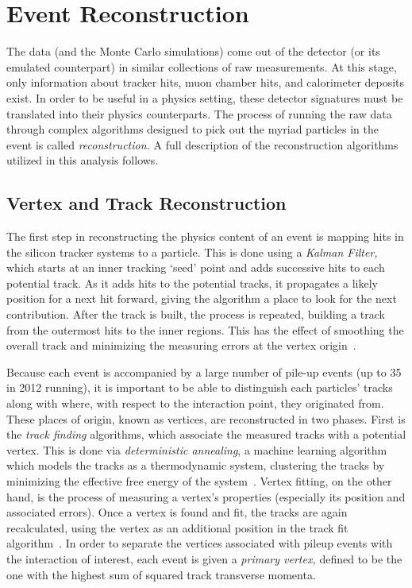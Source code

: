 \chapter{Event Reconstruction}
\label{chapter:eventReco}

The data (and the Monte Carlo simulations) come out of the detector (or its
emulated counterpart) in similar collections of raw measurements. At this stage,
only information about tracker hits, muon chamber hits, and calorimeter deposits
exist. In order to be useful in a physics setting, these detector signatures must be
translated into their physics counterparts. The process of running the raw data
through complex algorithms designed to pick out the myriad particles in the
event is called \emph{reconstruction.} A full description of the reconstruction
algorithms utilized in this analysis follows.

\section{Vertex and Track Reconstruction}
The first step in reconstructing the physics content of an event is mapping
hits in the silicon tracker systems to a particle. This is done using a
\emph{Kalman Filter,} which starts at an inner tracking `seed' point and adds
successive hits to each potential track. As it adds hits to the potential
tracks, it propagates a likely position for a next hit forward, giving the
algorithm a place to look for the next contribution. After the track is built,
the process is repeated, building a track from the outermost hits to the inner
regions. This has the effect of smoothing the overall track and minimizing the
measuring errors at the vertex origin~\cite{trackBuilding}. 

Because each event is accompanied by a large number of pile-up events (up to 35
in 2012 running),  it is important to be able to distinguish each particles'
tracks along with where, with respect to the interaction point, they originated
from. These places of origin, known as vertices, are reconstructed in two
phases. First is the \emph{track finding} algorithms, which associate the
measured tracks with a potential vertex. This is done via \emph{deterministic
annealing}, a machine learning algorithm which models the tracks as a
thermodynamic system, clustering the tracks by minimizing the effective free
energy of the system~\cite{detAnnealing, cmsdetAnnealing}. Vertex fitting, on
the other hand, is the process of measuring a vertex's properties (especially
its position and associated errors). Once a vertex is found and fit, the tracks
are again recalculated, using the vertex as an additional position in the track
fit algorithm~\cite{vertexFitting}. In order to separate the vertices associated
with pileup events with the interaction of interest, each event is given a
\emph{primary vertex,} defined to be the one with the highest sum of squared
track transverse momenta.

